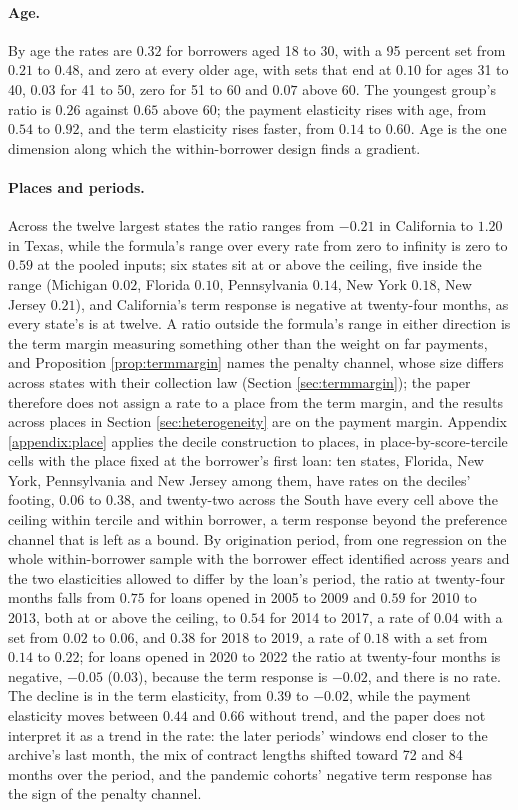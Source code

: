 \paragraph{Age.} By age the rates are $0.32$ for borrowers aged 18 to 30, with a 95 percent set from $0.21$ to $0.48$, and zero at every older age, with sets that end at $0.10$ for ages 31 to 40, $0.03$ for 41 to 50, zero for 51 to 60 and $0.07$ above 60. The youngest group's ratio is $0.26$ against $0.65$ above 60; the payment elasticity rises with age, from $0.54$ to $0.92$, and the term elasticity rises faster, from $0.14$ to $0.60$. Age is the one dimension along which the within-borrower design finds a gradient.

\paragraph{Places and periods.} Across the twelve largest states the ratio ranges from $-0.21$ in California to $1.20$ in Texas, while the formula's range over every rate from zero to infinity is zero to $0.59$ at the pooled inputs; six states sit at or above the ceiling, five inside the range (Michigan $0.02$, Florida $0.10$, Pennsylvania $0.14$, New York $0.18$, New Jersey $0.21$), and California's term response is negative at twenty-four months, as every state's is at twelve. A ratio outside the formula's range in either direction is the term margin measuring something other than the weight on far payments, and Proposition \ref{prop:termmargin} names the penalty channel, whose size differs across states with their collection law (Section \ref{sec:termmargin}); the paper therefore does not assign a rate to a place from the term margin, and the results across places in Section \ref{sec:heterogeneity} are on the payment margin. Appendix \ref{appendix:place} applies the decile construction to places, in place-by-score-tercile cells with the place fixed at the borrower's first loan: ten states, Florida, New York, Pennsylvania and New Jersey among them, have rates on the deciles' footing, $0.06$ to $0.38$, and twenty-two across the South have every cell above the ceiling within tercile and within borrower, a term response beyond the preference channel that is left as a bound. By origination period, from one regression on the whole within-borrower sample with the borrower effect identified across years and the two elasticities allowed to differ by the loan's period, the ratio at twenty-four months falls from $0.75$ for loans opened in 2005 to 2009 and $0.59$ for 2010 to 2013, both at or above the ceiling, to $0.54$ for 2014 to 2017, a rate of $0.04$ with a set from $0.02$ to $0.06$, and $0.38$ for 2018 to 2019, a rate of $0.18$ with a set from $0.14$ to $0.22$; for loans opened in 2020 to 2022 the ratio at twenty-four months is negative, $-0.05$ ($0.03$), because the term response is $-0.02$, and there is no rate. The decline is in the term elasticity, from $0.39$ to $-0.02$, while the payment elasticity moves between $0.44$ and $0.66$ without trend, and the paper does not interpret it as a trend in the rate: the later periods' windows end closer to the archive's last month, the mix of contract lengths shifted toward 72 and 84 months over the period, and the pandemic cohorts' negative term response has the sign of the penalty channel.

